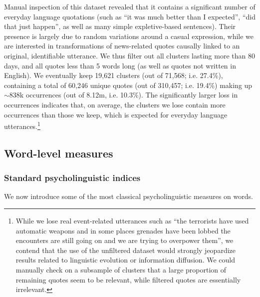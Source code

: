 Manual inspection of this dataset revealed that it contains a significant number of everyday language quotations (such as ``it was much better than I expected'', ``did that just happen'', as well as many simple expletive-based sentences).
Their presence is largely due to random variations around a casual expression, while we are interested in transformations of news-related quotes causally linked to an original, identifiable utterance.
We thus filter out all clusters lasting more than 80 days, and all quotes less than 5 words long %
 (as well as quotes not written in English).
We eventually keep 19,621 clusters (out of 71,568; i.e. 27.4\%), containing a total of 60,246 unique quotes (out of 310,457; i.e. 19.4\%) making up $\sim$838k occurrences (out of 8.12m, i.e. 10.3\%).
The significantly larger loss in occurrences indicates that, on average, the clusters we lose contain more occurrences than those we keep, which is expected for everyday language utterances.\footnote{While we lose real event-related utterances such as ``the terrorists have used automatic weapons and in some places grenades have been lobbed the encounters are still going on and we are trying to overpower them'', we contend that the use of the unfiltered dataset would strongly jeopardize results related to linguistic evolution or information diffusion. We could manually check on a subsample of clusters that a large proportion of remaining quotes seem to be relevant, while filtered quotes are essentially irrelevant.}

\subsection{Word-level measures}


\subsubsection{Standard psycholinguistic indices}

We now introduce some of the most classical psycholinguistic measures on words.

